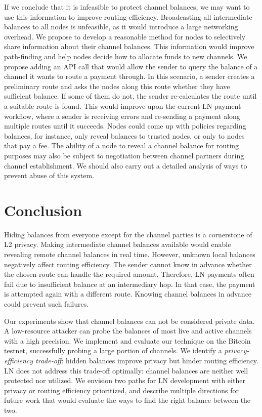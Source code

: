 If we conclude that it is infeasible to protect channel balances, we may want to use this information to improve routing efficiency.
Broadcasting all intermediate balances to all nodes is unfeasible, as it would introduce a large networking overhead.
We propose to develop a reasonable method for nodes to selectively share information about their channel balances.
This information would improve path-finding and help nodes decide how to allocate funds to new channels.
We propose adding an API call that would allow the sender to query the balance of a channel it wants to route a payment through.
In this scenario, a sender creates a preliminary route and asks the nodes along this route whether they have sufficient balance.
If some of them do not, the sender re-calculates the route until a suitable route is found.
This would improve upon the current LN payment workflow, where a sender is receiving errors and re-sending a payment along multiple routes until it succeeds.
Nodes could come up with policies regarding balances, for instance, only reveal balances to trusted nodes, or only to nodes that pay a fee.
The ability of a node to reveal a channel balance for routing purposes may also be subject to negotiation between channel partners during channel establishment.
We should also carry out a detailed analysis of ways to prevent abuse of this system.


\section{Conclusion} \label{sec:conclusion}

Hiding balances from everyone except for the channel parties is a cornerstone of L2 privacy.
Making intermediate channel balances available would enable revealing remote channel balances in real time.
However, unknown local balances negatively affect routing efficiency.
The sender cannot know in advance whether the chosen route can handle the required amount.
Therefore, LN payments often fail due to insufficient balance at an intermediary hop.
In that case, the payment is attempted again with a different route.
Knowing channel balances in advance could prevent such failures.

Our experiments show that channel balances can not be considered private data.
A low-resource attacker can probe the balances of most live and active channels with a high precision.
We implement and evaluate our technique on the Bitcoin testnet, successfully probing a large portion of channels.
We identify a \textit{privacy-efficiency trade-off}: hidden balances improve privacy but hinder routing efficiency.
LN does not address this trade-off optimally: channel balances are neither well protected nor utilized.
We envision two paths for LN development with either privacy or routing efficiency prioritized, and describe multiple directions for future work that would evaluate the ways to find the right balance between the two.